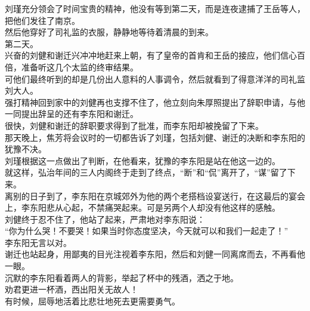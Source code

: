 \begin{multicols}{\theparacolNo}
刘瑾充分领会了时间宝贵的精神，他没有等到第二天，而是连夜逮捕了王岳等人，把他们发往了南京。\\

然后他穿好了司礼监的衣服，静静地等待着清晨的到来。\\

第二天。\\

兴奋的刘健和谢迁兴冲冲地赶来上朝，有了皇帝的首肯和王岳的接应，他们信心百倍，准备听这几个太监的终审结果。\\

可他们最终听到的却是几份出人意料的人事调令，然后就看到了得意洋洋的司礼监刘大人。\\

强打精神回到家中的刘健再也支撑不住了，他立刻向朱厚照提出了辞职申请，与他一同提出辞呈的还有李东阳和谢迁。\\

很快，刘健和谢迁的辞职要求得到了批准，而李东阳却被挽留了下来。\\

那天晚上，焦芳将会议时的一切都告诉了刘瑾，包括刘健、谢迁的决断和李东阳的犹豫不决。\\

刘瑾根据这一点做出了判断，在他看来，犹豫的李东阳是站在他这一边的。\\

就这样，弘治年间的三人内阁终于走到了终点，“断”和“侃”离开了，“谋”留了下来。\\

离别的日子到了，李东阳在京城郊外为他的两个老搭档设宴送行，在这最后的宴会上，李东阳悲从心起，不禁痛哭起来。可是另两个人却没有他这样的感触。\\

刘健终于忍不住了，他站了起来，严肃地对李东阳说：\\

“你为什么哭！不要哭！如果当时你态度坚决，今天就可以和我们一起走了！”\\

李东阳无言以对。\\

谢迁也站起身，用鄙夷的目光注视着李东阳，然后和刘健一同离席而去，不再看他一眼。\\

沉默的李东阳看着两人的背影，举起了杯中的残酒，洒之于地。\\

劝君更进一杯酒，西出阳关无故人！\\

有时候，屈辱地活着比悲壮地死去更需要勇气。\\
\ifnum{}
	\end{multicols}
\fi
\newpage
